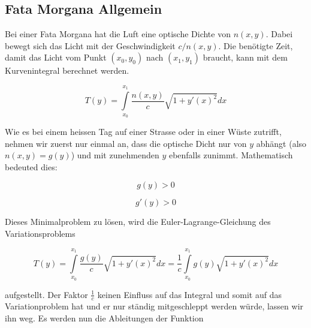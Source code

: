 
\subsection{Fata Morgana Allgemein}

Bei einer Fata Morgana hat die Luft eine optische Dichte von $n(x,y)$. 
Dabei bewegt sich das Licht mit der Geschwindigkeit $c/n(x,y)$. 
Die benötigte Zeit, damit das Licht vom Punkt $(x_0, y_0)$ nach $(x_1, y_1)$ braucht,
kann mit dem Kurvenintegral berechnet werden.

\begin{equation}
T(y) = \int \limits_{x_0}^{x_1} \frac{n(x,y)}{c} \sqrt{1 + y'(x)^2} dx
\end{equation}

Wie es bei einem heissen Tag auf einer Strasse oder in einer Wüste zutrifft,
nehmen wir zuerst nur einmal an, dass die optische Dicht nur von $y$ abhängt
(also $n(x,y) = g(y)$) und mit zunehmenden $y$ ebenfalls zunimmt. 
Mathematisch bedeuted dies:

\begin{equation}
g(y) > 0 
\end{equation}

\begin{equation}
g'(y) > 0
\end{equation}

Dieses Minimalproblem zu lösen, wird die Euler-Lagrange-Gleichung des Variationsproblems

\begin{equation}
T(y) = \int \limits_{x_0}^{x_1} \frac{g(y)}{c} \sqrt{1 + y'(x)^2} dx = \frac{1}{c} \int \limits_{x_0}^{x_1} g(y) \sqrt{1 + y'(x)^2} dx
\end{equation}

aufgestellt. Der Faktor $\frac{1}{c}$ keinen Einfluss auf das Integral und 
somit auf das Variationproblem hat 
und er nur ständig mitgeschleppt werden würde, lassen wir ihn weg.
Es werden nun die Ableitungen der Funktion 

